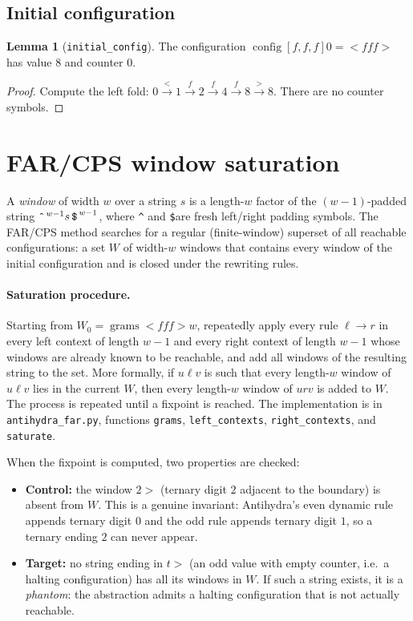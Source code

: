 \documentclass[11pt,a4paper]{article}
\theoremstyle{definition}
\newtheorem{lemma}[definition]{Lemma}
\newcommand{\lt}{<}
\newcommand{\gt}{>}
\newcommand{\config}{\operatorname{config}}
\newcommand{\grams}{\operatorname{grams}}
\newcommand{\lpad}{\texttt{\^{}}}
\newcommand{\rpad}{\texttt{\$}}
\begin{document}
\subsection{Initial configuration}

\begin{lemma}[\texttt{initial\_config}]
  \label{lem:initial-config}
  The configuration $\config{[f,f,f]}{0}=\lt fff\gt$ has value $8$ and
  counter $0$.
\end{lemma}
\begin{proof}
  Compute the left fold:
  $0\xrightarrow{\lt}1\xrightarrow{f}2\xrightarrow{f}4\xrightarrow{f}8\xrightarrow{\gt}8$.
  There are no counter symbols.
\end{proof}

\section{FAR/CPS window saturation}
\label{sec:far}

A \emph{window} of width $w$ over a string $s$ is a length-$w$ factor of
the $(w-1)$-padded string $\lpad^{\,w-1}s\,\rpad^{\,w-1}$, where \lpad
and \rpad are fresh left/right padding symbols.  The FAR/CPS method
searches for a regular (finite-window) superset of all reachable
configurations: a set $W$ of width-$w$ windows that contains every window
of the initial configuration and is closed under the rewriting rules.

\paragraph{Saturation procedure.}
Starting from $W_0=\grams{\lt fff\gt}{w}$, repeatedly apply every rule
$\ell\to r$ in every left context of length $w-1$ and every right
context of length $w-1$ whose windows are already known to be reachable,
and add all windows of the resulting string to the set.  More
formally, if $u\ell v$ is such that every length-$w$ window of
$u\ell v$ lies in the current $W$, then every length-$w$ window of
$urv$ is added to $W$.  The process is repeated until a fixpoint is
reached.  The implementation is in \texttt{antihydra\_far.py}, functions
\texttt{grams}, \texttt{left\_contexts}, \texttt{right\_contexts}, and
\texttt{saturate}.

When the fixpoint is computed, two properties are checked:
\begin{itemize}
\item \textbf{Control:} the window $2\gt$ (ternary digit $2$ adjacent
to the boundary) is absent from $W$.  This is a genuine invariant:
Antihydra's even dynamic rule appends ternary digit $0$ and the odd
rule appends ternary digit $1$, so a ternary ending $2$ can never
appear.
\item \textbf{Target:} no string ending in $t\gt$ (an odd value with
empty counter, i.e.\ a halting configuration) has all its windows in
$W$.  If such a string exists, it is a \emph{phantom}: the abstraction
admits a halting configuration that is not actually reachable.
\end{itemize}
\end{document}
